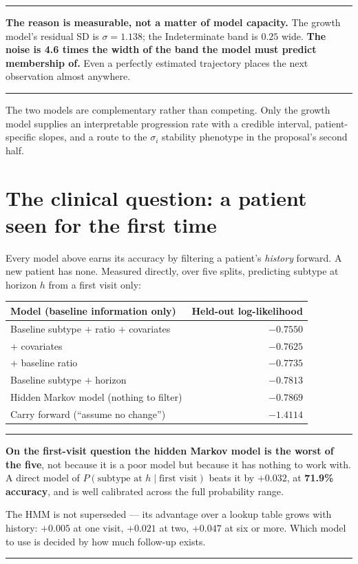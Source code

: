 \documentclass[11pt,a4paper]{article}
\newenvironment{keypoint}
  {\begin{center}\begin{minipage}{0.94\textwidth}%
   \vspace{4pt}\hrule\vspace{7pt}\small}
  {\vspace{7pt}\hrule\vspace{4pt}\end{minipage}\end{center}}
\begin{document}
\begin{keypoint}
\textbf{The reason is measurable, not a matter of model capacity.} The growth
model's residual SD is $\sigma = 1.138$; the Indeterminate band is $0.25$ wide.
\textbf{The noise is 4.6 times the width of the band the model must predict
membership of.} Even a perfectly estimated trajectory places the next
observation almost anywhere.
\end{keypoint}

\noindent
The two models are complementary rather than competing. Only the growth model
supplies an interpretable progression rate with a credible interval,
patient-specific slopes, and a route to the $\sigma_i$ stability phenotype in the
proposal's second half.

\section{The clinical question: a patient seen for the first time}

Every model above earns its accuracy by filtering a patient's \emph{history}
forward. A new patient has none. Measured directly, over five splits, predicting
subtype at horizon $h$ from a first visit only:

\begin{table}[H]
\centering
\begin{tabular}{@{}lr@{}}
\toprule
\textbf{Model (baseline information only)} & \textbf{Held-out log-likelihood} \\
\midrule
Baseline subtype $+$ ratio $+$ covariates & $\mathbf{-0.7550}$ \\
$+$ covariates                            & $-0.7625$ \\
$+$ baseline ratio                        & $-0.7735$ \\
Baseline subtype $+$ horizon              & $-0.7813$ \\
Hidden Markov model (nothing to filter)   & $-0.7869$ \\
Carry forward (``assume no change'')      & $-1.4114$ \\
\bottomrule
\end{tabular}
\end{table}

\begin{keypoint}
\textbf{On the first-visit question the hidden Markov model is the worst of the
five}, not because it is a poor model but because it has nothing to work with. A
direct model of $P(\text{subtype at } h \mid \text{first visit})$ beats it by
$+0.032$, at \textbf{71.9\% accuracy}, and is well calibrated across the full
probability range.

The HMM is not superseded --- its advantage over a lookup table grows with
history: $+0.005$ at one visit, $+0.021$ at two, $+0.047$ at six or more. Which
model to use is decided by how much follow-up exists.
\end{keypoint}
\end{document}

